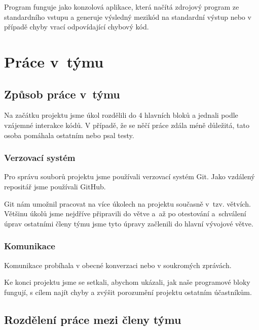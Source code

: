 \documentclass[a4paper, 11pt]{article}
\begin{document}
    Program funguje jako konzolová aplikace, která načítá zdrojový program ze standardního vstupu a generuje
    výsledný mezikód na standardní výstup nebo v případě chyby vrací odpovídající chybový kód.



	\section{Práce v~týmu}

	\subsection{Způsob práce v~týmu}

	Na začátku projektu jsme úkol rozdělili do 4 hlavních bloků a jednali podle vzájemné interakce kódů. V případě, že se něčí práce zdála méně důležitá, tato osoba pomáhala ostatním nebo psal testy.
	\subsubsection{Verzovací systém}

	Pro správu souborů projektu jsme používali verzovací systém Git. Jako vzdálený repositář jsme používali \mbox{GitHub}.

	Git nám umožnil pracovat na více úkolech na projektu současně v~tzv. větvích. Většinu úkolů jsme nejdříve připravili
	do větve a~až po otestování a~schválení úprav ostatními členy týmu jsme tyto úpravy začlenili do hlavní
	vývojové větve.

	\subsubsection{Komunikace}

	Komunikace probíhala v obecné konverzaci nebo v soukromých zprávách.

	Ke konci projektu jsme se setkali, abychom ukázali, jak naše programové bloky fungují, s cílem najít chyby a zvýšit porozumění projektu ostatním účastníkům.


	\subsection{Rozdělení práce mezi členy týmu}
\end{document}
